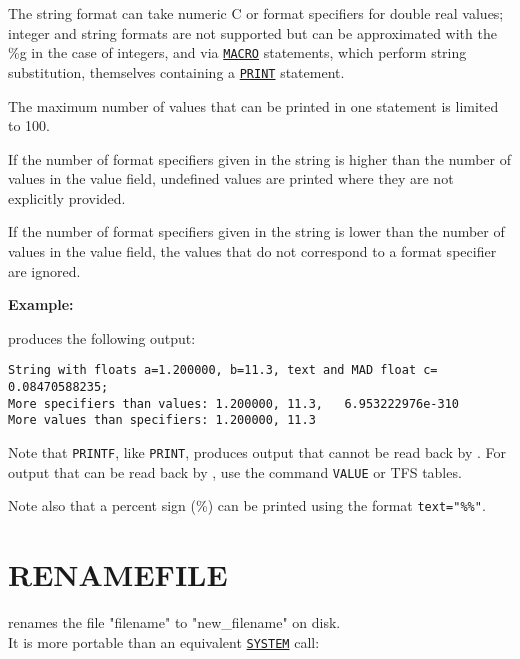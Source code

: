 The string format can take numeric C or \madx format specifiers for
double real values; integer and string formats are not supported but 
can be approximated with the \%g in the case of integers, and via
\hyperref[sec:macro]{\tt MACRO} statements, which perform string
substitution, themselves containing a \hyperref[sec:print]{\tt PRINT}
statement.  

The maximum number of values that can be printed in one
statement is limited to 100. 

If the number of format specifiers given in the string is higher 
than the number of values in the value field, undefined values are printed 
where they are not explicitly provided. 

If the number of format specifiers given in the string is lower 
than the number of values in the value field, the values that 
do not correspond to a format specifier are ignored. 


{\bf Example:}

produces the following output:
\begin{verbatim}
String with floats a=1.200000, b=11.3, text and MAD float c=     0.08470588235;
More specifiers than values: 1.200000, 11.3,   6.953222976e-310
More values than specifiers: 1.200000, 11.3
\end{verbatim}

Note that {\tt PRINTF}, like {\tt PRINT}, produces output that
cannot be read back by \madx. For output that can be read back by \madx,
use the command {\tt VALUE} or TFS tables.

Note also that a percent sign (\%) can be printed using the format
\verb|text="%%"|. 


\section{RENAMEFILE}
\label{sec:renamefile}
renames the file "filename" to "new\_filename" on disk. \\
It is more portable than an equivalent \hyperref[sec:system]{\tt SYSTEM} call:

